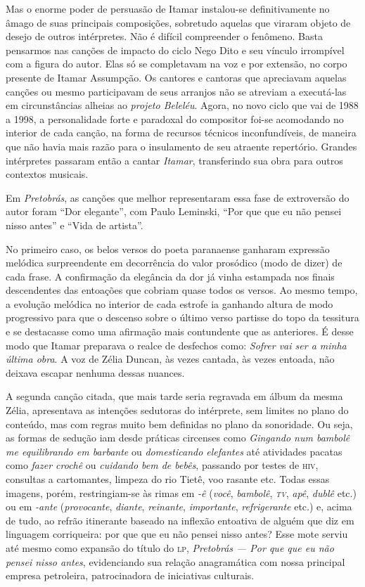 Mas o enorme poder de persuasão de Itamar instalou-se definitivamente no
âmago de suas principais composições, sobretudo aquelas que viraram
objeto de desejo de outros intérpretes. Não é difícil compreender o
fenômeno. Basta pensarmos nas canções de impacto do ciclo Nego Dito e
seu vínculo irrompível com a figura do autor. Elas só se completavam na
voz e por extensão, no corpo presente de Itamar Assumpção. Os cantores e
cantoras que apreciavam aquelas canções ou mesmo participavam de seus
arranjos não se atreviam a executá-las em circunstâncias alheias ao
\textit{projeto Beleléu}. Agora, no novo ciclo que vai de 1988 a 1998, a
personalidade forte e paradoxal do compositor foi-se acomodando no
interior de cada canção, na forma de recursos técnicos inconfundíveis,
de maneira que não havia mais razão para o insulamento de seu atraente
repertório. Grandes intérpretes passaram então a cantar \textit{Itamar},
transferindo sua obra para outros contextos musicais.

Em \textit{Pretobrás}, as canções que melhor representaram essa fase de
extroversão do autor foram ``Dor elegante'', com Paulo Leminski, ``Por que que
eu não pensei nisso antes'' e ``Vida de artista''.

No primeiro caso, os belos versos do poeta paranaense ganharam expressão
melódica surpreendente em decorrência do valor prosódico (modo de dizer)
de cada frase. A confirmação da elegância da dor já vinha estampada nos
finais descendentes das entoações que cobriam quase todos os versos. Ao
mesmo tempo, a evolução melódica no interior de cada estrofe ia ganhando
altura de modo progressivo para que o descenso sobre o último verso
partisse do topo da tessitura e se destacasse como uma afirmação mais
contundente que as anteriores. É desse modo que Itamar preparava o
realce de desfechos como: \textit{Sofrer vai ser a minha última obra}. A voz
de Zélia Duncan, às vezes cantada, às vezes entoada, não deixava escapar
nenhuma dessas nuances.

A segunda canção citada, que mais tarde seria regravada em álbum da
mesma Zélia, apresentava as intenções sedutoras do intérprete, sem
limites no plano do conteúdo, mas com regras muito bem definidas no
plano da sonoridade. Ou seja, as formas de sedução iam desde práticas
circenses como \textit{Gingando num bambolê me equilibrando em barbante} ou
\textit{domesticando elefantes} até atividades pacatas como \textit{fazer crochê}
ou \textit{cuidando bem de bebês}, passando por testes de \textsc{hiv}, consultas a
cartomantes, limpeza do rio Tietê, voo rasante etc. Todas essas imagens,
porém, restringiam-se às rimas em \textit{-ê} (\textit{você}, \textit{bambolê}, \textit{\textsc{tv}},
\textit{apê}, \textit{dublê} etc.) ou em \textit{-ante} (\textit{provocante}, \textit{diante},
\textit{reinante}, \textit{importante}, \textit{refrigerante} etc.) e, acima de tudo,
ao refrão itinerante baseado na inflexão entoativa de alguém que diz em
linguagem corriqueira: por que que eu não pensei nisso antes? Esse mote
serviu até mesmo como expansão do título do \textsc{lp}, \textit{Pretobrás --- Por que que
eu não pensei nisso antes}, evidenciando sua relação anagramática com
nossa principal empresa petroleira, patrocinadora de iniciativas
culturais.

